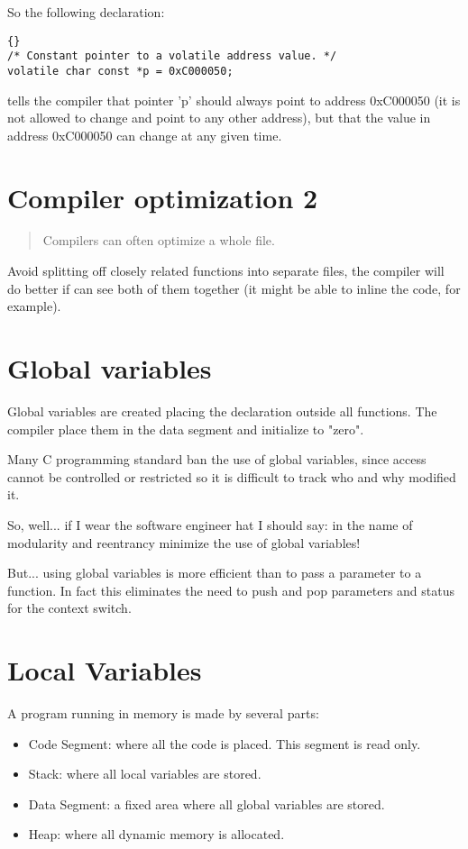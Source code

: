 \documentclass{report}
\begin{document}
So the following declaration:
\begin{lstlisting}{}
/* Constant pointer to a volatile address value. */
volatile char const *p = 0xC000050;
\end{lstlisting}
tells the compiler that pointer 'p' should always point to address 0xC000050 (it is not allowed to change and point to any other address), but that the value in address 0xC000050 can change at any given time.


\section{Compiler optimization 2}
\begin{quote}
Compilers can often optimize a whole file.
\end{quote}
Avoid splitting off closely related functions into separate files, the compiler will do better if can see both of them together (it might be able to inline the code, for example). 

\section{Global variables}
Global variables are created placing the declaration outside all functions. The compiler place them in the data segment and initialize to "zero".

Many C programming standard ban the use of global variables, since access cannot be controlled or restricted so it is difficult to track who and why modified it.

So, well... if I wear the software engineer hat I should say: in the name of modularity and reentrancy minimize the use of global variables!

But... using global variables is more efficient than to pass a parameter to a function. In fact this eliminates the need to push and pop parameters and status for the context switch.


\section{Local Variables}
A program running in memory is made by several parts:
\begin{itemize}
\item Code Segment: where all the code is placed. This segment is read only.
\item Stack: where all local variables are stored.
\item Data Segment: a fixed area where all global variables are stored.
\item Heap: where all dynamic memory is allocated.
\end{itemize}
\end{document}
